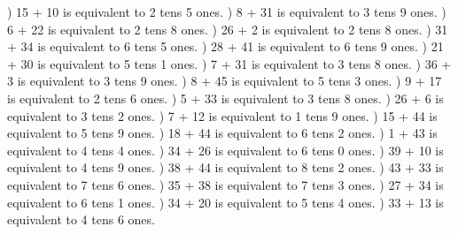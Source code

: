 \documentclass{article}%
\begin{document}
) 15 + 10 is equivalent to 2 tens 5 ones.%
) 8 + 31 is equivalent to 3 tens 9 ones.%
) 6 + 22 is equivalent to 2 tens 8 ones.%
) 26 + 2 is equivalent to 2 tens 8 ones.%
) 31 + 34 is equivalent to 6 tens 5 ones.%
) 28 + 41 is equivalent to 6 tens 9 ones.%
) 21 + 30 is equivalent to 5 tens 1 ones.%
) 7 + 31 is equivalent to 3 tens 8 ones.%
) 36 + 3 is equivalent to 3 tens 9 ones.%
) 8 + 45 is equivalent to 5 tens 3 ones.%
) 9 + 17 is equivalent to 2 tens 6 ones.%
) 5 + 33 is equivalent to 3 tens 8 ones.%
) 26 + 6 is equivalent to 3 tens 2 ones.%
) 7 + 12 is equivalent to 1 tens 9 ones.%
) 15 + 44 is equivalent to 5 tens 9 ones.%
) 18 + 44 is equivalent to 6 tens 2 ones.%
) 1 + 43 is equivalent to 4 tens 4 ones.%
) 34 + 26 is equivalent to 6 tens 0 ones.%
) 39 + 10 is equivalent to 4 tens 9 ones.%
) 38 + 44 is equivalent to 8 tens 2 ones.%
) 43 + 33 is equivalent to 7 tens 6 ones.%
) 35 + 38 is equivalent to 7 tens 3 ones.%
) 27 + 34 is equivalent to 6 tens 1 ones.%
) 34 + 20 is equivalent to 5 tens 4 ones.%
) 33 + 13 is equivalent to 4 tens 6 ones.%
\newline%
\newpage%
\end{document}
